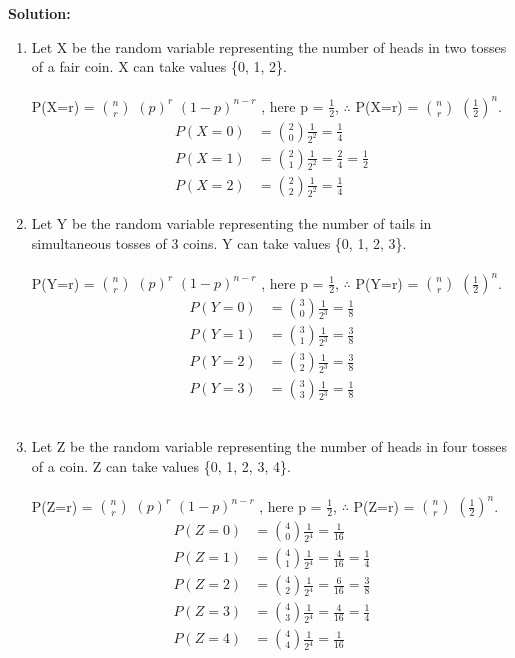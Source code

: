 \documentclass[journal,12pt,onecolumn]{IEEEtran}
\begin{document}
\textbf{Solution:}
\begin{enumerate}[label=(\roman*)]
\item Let X be the random variable representing the number of heads in two tosses of a fair coin. X can take values \{0, 1, 2\}.
\\\\ P(X=r) = $n \choose r$ $(p)^r$ $(1-p)^{n-r}$ , here p = $\frac{1}{2}$,  $\therefore$ P(X=r) = $n \choose r$ $ (\frac{1}{2}) ^n $.
\begin{align}
P(X=0) &= {2 \choose 0} \frac{1}{2^2} = \frac{1}{4} \\ P(X=1) &= {2 \choose 1}  \frac{1}{2^2} = \frac{2}{4} = \frac{1}{2}\\ P(X=2) &= {2 \choose 2}  \frac{1}{2^2} = \frac{1}{4}
\end{align}
\item Let Y be the random variable representing the number of tails in simultaneous tosses of 3 coins. Y can take values \{0, 1, 2, 3\}.
\\\\ P(Y=r) = $n \choose r$ $(p)^r$ $(1-p)^{n-r}$ , here p = $\frac{1}{2}$,  $\therefore$ P(Y=r) = $n \choose r$ $ (\frac{1}{2}) ^n $.
\begin{align}
P(Y=0) &= {3 \choose 0} \frac{1}{2^3} = \frac{1}{8} \\ P(Y=1) &= {3 \choose 1}  \frac{1}{2^3} = \frac{3}{8}\\ P(Y=2) &= {3 \choose 2}  \frac{1}{2^3} = \frac{3}{8} \\ P(Y=3) &= {3 \choose 3}  \frac{1}{2^3}  = \frac{1}{8}
\end{align}
\\
\item Let Z be the random variable representing the number of heads in four tosses of a coin. Z can take values \{0, 1, 2, 3, 4\}.
\\\\ P(Z=r) = $n \choose r$ $(p)^r$ $(1-p)^{n-r}$ , here p = $\frac{1}{2}$,  $\therefore$ P(Z=r) = $n \choose r$ $ (\frac{1}{2}) ^n $.
\begin{align}
P(Z=0) &= {4 \choose 0}  \frac{1}{2^4} = \frac{1}{16}\\ P(Z=1) &= {4 \choose 1}  \frac{1}{2^4} = \frac{4}{16} = \frac{1}{4} \\ P(Z=2) &= {4 \choose 2}  \frac{1}{2^4} = \frac{6}{16} = \frac{3}{8}\\ P(Z=3) &= {4 \choose 3}  \frac{1}{2^4} = \frac{4}{16} = \frac{1}{4}\\ P(Z=4) &= {4 \choose 4}  \frac{1}{2^4} = \frac{1}{16}
\end{align}
\end{enumerate}
\end{document}
